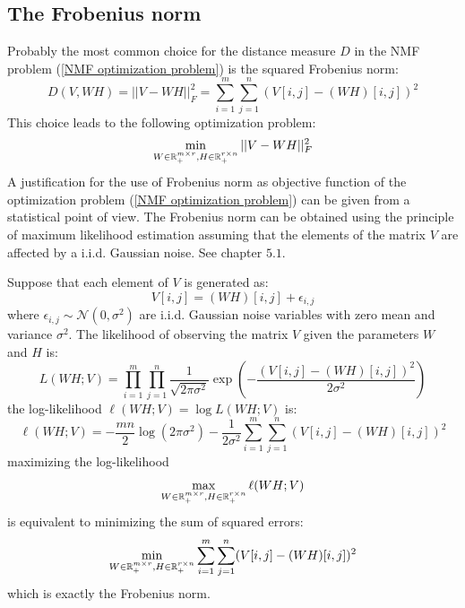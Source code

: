 \subsection{The Frobenius norm}\label{Frobenius norm section}
Probably the most common choice for the distance measure $D$ in the NMF problem (\ref{NMF optimization problem}) is the squared Frobenius norm:
\begin{equation}
    D(V, WH) = ||V - WH||_F^2 = \sum_{i=1}^{m} \sum_{j=1}^{n} (V[i,j] - (WH)[i,j])^2
\end{equation}
This choice leads to the following optimization problem:
\begin{equation}
    \min_{W \in \mathbb{R}_+^{m \times r}, H \in \mathbb{R}_+^{r \times n}} ||V - WH||_F^2
\end{equation}
A justification for the use of Frobenius norm as objective function of the optimization problem (\ref{NMF optimization problem}) can be given from a statistical point of view.
The Frobenius norm can be obtained using the principle of maximum likelihood estimation assuming that the elements of the matrix $V$ are affected by a i.i.d. Gaussian noise.
See \cite{gillis2020nonnegative} chapter $5.1$.
\par
Suppose that each element of $V$ is generated as:
\begin{equation}
    V[i,j] = (WH)[i,j] + \epsilon_{i,j}
\end{equation}
where $\epsilon_{i,j} \sim \mathcal{N}(0, \sigma^2)$ are i.i.d. Gaussian noise variables with zero mean and variance $\sigma^2$.
The likelihood of observing the matrix $V$ given the parameters $W$ and $H$ is:
\begin{equation}
    L(WH ; V) = \prod_{i=1}^{m} \prod_{j=1}^{n} \frac{1}{\sqrt{2 \pi \sigma^2}} \exp\left(-\frac{(V[i,j] - (WH)[i,j])^2}{2 \sigma^2}\right)
\end{equation}
the log-likelihood $\ell(WH ; V) = \log L(WH ; V)$  is:
\begin{equation}
    \ell(WH ; V) =  -\frac{mn}{2} \log(2 \pi \sigma^2) - \frac{1}{2 \sigma^2} \sum_{i=1}^{m} \sum_{j=1}^{n} (V[i,j] - (WH)[i,j])^2
\end{equation}
maximizing the log-likelihood 
\begin{equation}
    \max_{W \in \mathbb{R}_+^{m \times r}, H \in \mathbb{R}_+^{r \times n}} \ell(WH ; V)
\end{equation}
is equivalent to minimizing the sum of squared errors:
\begin{equation}
    \min_{W \in \mathbb{R}_+^{m \times r}, H \in \mathbb{R}_+^{r \times n}} \sum_{i=1}^{m} \sum_{j=1}^{n} (V[i,j] - (WH)[i,j])^2
\end{equation}
which is exactly the Frobenius norm.
\par
